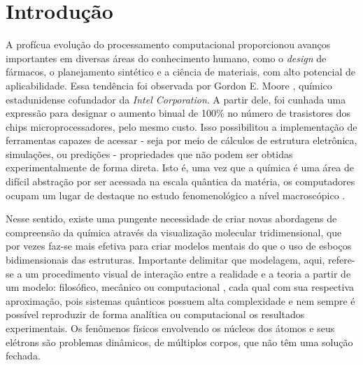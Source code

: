 \chapter{Introdução}

A profícua evolução do processamento computacional proporcionou avanços importantes em diversas áreas do conhecimento humano, como o \textit{design} de fármacos, o planejamento sintético e a ciência de materiais, com alto potencial de aplicabilidade. Essa tendência foi observada por Gordon E. Moore \autocite{Mack2011, Shalf2020}, químico estadunidense 
cofundador da \textit{Intel Corporation}. A partir dele, foi cunhada uma expressão para designar o aumento binual de 100\% no número de trasistores dos chips microprocessadores, pelo mesmo custo. Isso possibilitou a implementação de ferramentas capazes de acessar - seja por meio de cálculos de estrutura eletrônica, 
simulações, ou predições - propriedades que não podem ser obtidas experimentalmente de forma direta. Isto é, uma vez que a química é uma área de difícil abstração por ser acessada na escala quântica da matéria, os computadores ocupam um lugar de destaque no estudo fenomenológico a nível macroscópico \autocite{Allouche2010, Rayan2017}.

Nesse sentido, existe uma pungente necessidade de criar novas abordagens de compreensão da química através da visualização molecular tridimensional, que por vezes faz-se mais efetiva para criar modelos mentais do que o uso de esboços bidimensionais das estruturas. Importante delimitar que modelagem, aqui, refere-se a um procedimento visual de interação entre a realidade e a teoria a partir de um modelo: filosófico, mecânico ou computacional \autocite{Snyder2021}, cada qual com sua respectiva aproximação, pois sistemas quânticos possuem alta complexidade e nem sempre é possível reproduzir de forma analítica ou computacional os resultados experimentais. Os fenômenos físicos envolvendo os núcleos dos átomos e seus elétrons são problemas dinâmicos, de múltiplos corpos, que não têm uma solução fechada.



